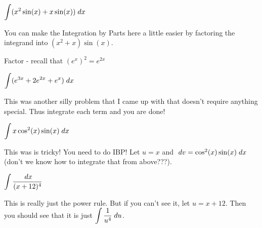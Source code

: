 \documentclass{ximera}
\theoremstyle{definition}
\newcommand{\du}{\; du}
\newcommand{\dv}{\; dv}
\begin{document}
\begin{problem}
$\displaystyle \int (x^2\sin(x) + x\sin(x)) \; dx$
\begin{multipleChoice}
\end{multipleChoice}
\begin{feedback}[correct]
You can make the Integration by Parts here a little easier by factoring the integrand into $(x^2+x)\sin(x)$.
\end{feedback}
\end{problem}
\begin{problem}
\begin{hint}
Factor - recall that $(e^x)^2 = e^{2x}$
\end{hint}
$\displaystyle \int (e^{3x} + 2e^{2x} + e^x) \; dx$
\begin{multipleChoice}
\end{multipleChoice}
\begin{feedback}[correct]
This was another silly problem that I came up with that doesn't require anything special. Thus integrate each term and you are done!
\end{feedback}
\end{problem}
\begin{problem}

$\displaystyle \int x\cos^2(x)\sin(x) \; dx$
\begin{multipleChoice}
\end{multipleChoice}
\begin{feedback}[correct]
This was is tricky! You need to do IBP! Let $u=x$ and $\dv = \cos^2(x)\sin(x) \dx$ (don't we know how to integrate that from above???).
\end{feedback}
\end{problem}
\begin{problem}
$\displaystyle \int \displaystyle\frac{\; dx}{(x+12)^4}$
\begin{multipleChoice}
\end{multipleChoice}
\begin{feedback}[correct]
This is really just the power rule. But if you can't see it, let $u=x+12$. Then you should see that it is just $\dint \df{1}{u^4} \du$.
\end{feedback}
\end{problem}
\end{document}
